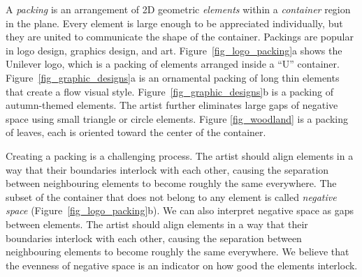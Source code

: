 


A \textit{packing} is an arrangement of 2D geometric
\textit{elements} within a \textit{container} region in the plane.
Every element is large enough to be appreciated individually, 
but they are united to communicate the shape of the container. 
Packings are popular in logo design, graphics design, and art.
Figure~\ref{fig_logo_packing}a shows the Unilever logo,
which is a packing of elements arranged inside a ``U'' container.
Figure~\ref{fig_graphic_designs}a is an ornamental packing
of long thin elements that create a flow visual style.
Figure~\ref{fig_graphic_designs}b is a packing
of autumn-themed elements. The artist further eliminates large gaps of
negative space using small triangle or circle elements.
Figure \ref{fig_woodland} is a packing of leaves, each is oriented toward the center of the container.





Creating a packing is a challenging process.
The artist should align elements in a way that their boundaries interlock with each other,
causing the separation between neighbouring elements to become roughly the same everywhere.
The subset of the container that does not belong to any element is
called \textit{negative space} (Figure~\ref{fig_logo_packing}b).
We can also interpret negative space as gaps between elements.
The artist should align elements in a way that their boundaries interlock with each other,
causing the separation between neighbouring elements to become roughly the same everywhere.
We believe that the evenness of negative space is an indicator on how good the elements interlock.

